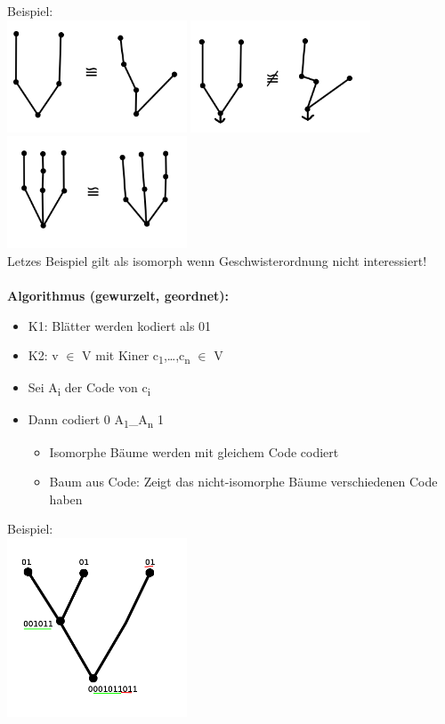 Beispiel:\\
\includegraphics[width=0.4\textwidth]{lectures/161028/pix/graph1.png}
\includegraphics[width=0.4\textwidth]{lectures/161028/pix/graph2.png}\\
\includegraphics[width=0.4\textwidth]{lectures/161028/pix/graph3.png}\\
Letzes Beispiel gilt als isomorph wenn Geschwisterordnung nicht interessiert!
\\\\
\textbf{Algorithmus (gewurzelt, geordnet):}
\begin{itemize}
	\item K1: Blätter werden kodiert als 01
	\item K2: v $\in$ V mit Kiner c\textsubscript{1},\ldots,c\textsubscript{n} $\in$ V
	\item Sei A\textsubscript{i} der Code von c\textsubscript{i}
	\item Dann codiert 0 A\textsubscript{1}\_A\textsubscript{n} 1
	\begin{itemize}
		\item Isomorphe Bäume werden mit gleichem Code codiert
		\item Baum aus Code: Zeigt das nicht-isomorphe Bäume verschiedenen Code haben
	\end{itemize}
\end{itemize}
Beispiel:\\
\includegraphics[width=0.4\textwidth]{lectures/161028/pix/isomorph.png}
\newpage


